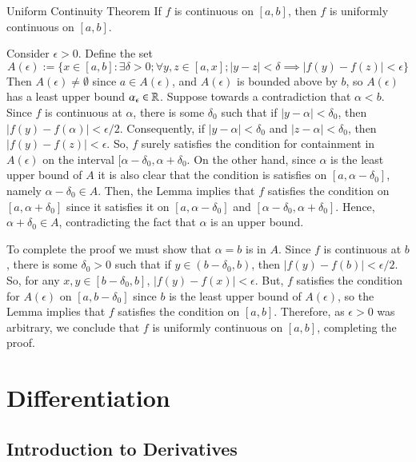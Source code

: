 \documentclass[12pt]{report}
\begin{document}
\begin{thm}{Uniform Continuity Theorem}{}
    If $f$ is continuous on $[a,b]$, then $f$ is uniformly continuous on $[a,b]$.
\end{thm}
\begin{proof*}{}{}
    Consider $\epsilon > 0$. Define the set $$A(\epsilon) := \{x \in [a,b]:\exists \delta > 0;\forall y,z \in [a,x];|y-z| < \delta \implies|f(y) - f(z)| < \epsilon\}$$
    Then $A(\epsilon) \neq \emptyset$ since $a \in A(\epsilon)$, and $A(\epsilon)$ is bounded above by $b$, so $A(\epsilon)$ has a least upper bound $\alpha_{\epsilon} \in \mathbb R$. Suppose towards a contradiction that $\alpha < b$. Since $f$ is continuous at $\alpha$, there is some $\delta_0$ such that if $|y-\alpha| < \delta_0$, then $|f(y) - f(\alpha)| < \epsilon/2$. Consequently, if $|y-\alpha| < \delta_0$ and $|z-\alpha| < \delta_0$, then $|f(y) - f(z)| < \epsilon$. So, $f$ surely satisfies the condition for containment in $A(\epsilon)$ on the interval $[\alpha - \delta_0, \alpha + \delta_0$. On the other hand, since $\alpha$ is the least upper bound of $A$ it is also clear that the condition is satisfies on $[a,\alpha - \delta_0]$, namely $\alpha - \delta_0 \in A$. Then, the Lemma implies that $f$ satisfies the condition on $[a,\alpha+\delta_0]$ since it satisfies it on $[a,\alpha - \delta_0]$ and $[\alpha - \delta_0, \alpha + \delta_0]$. Hence, $\alpha + \delta_0 \in A$, contradicting the fact that $\alpha$ is an upper bound.


    To complete the proof we must show that $\alpha = b$ is in $A$. Since $f$ is continuous at $b$, there is some $\delta_0 > 0$ such that if $y \in (b-\delta_0, b)$, then $|f(y) - f(b)| < \epsilon/2$. So, for any $x,y \in [b-\delta_0,b]$, $|f(y) - f(x)| < \epsilon$. But, $f$ satisfies the condition for $A(\epsilon)$ on $[a,b-\delta_0]$ since $b$ is the least upper bound of $A(\epsilon)$, so the Lemma implies that $f$ satisfies the condition on $[a,b]$. Therefore, as $\epsilon > 0$ was arbitrary, we conclude that $f$ is uniformly continuous on $[a,b]$, completing the proof.
\end{proof*}







\chapter{Differentiation}

\section{Introduction to Derivatives}
\end{document}
